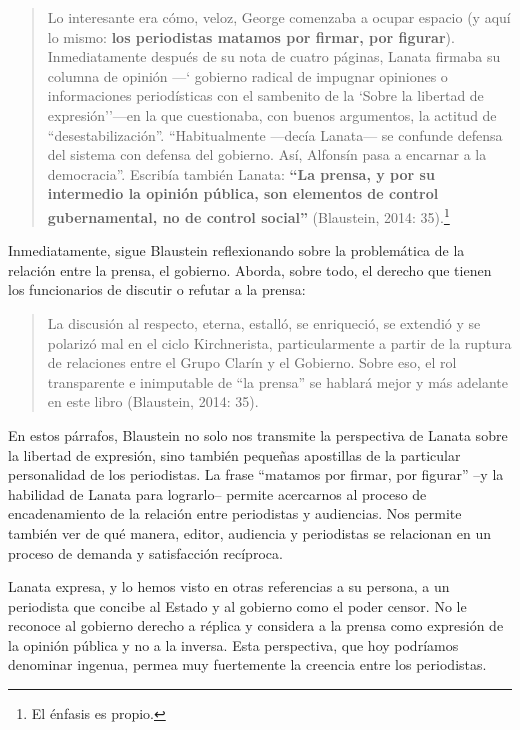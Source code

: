\begin{quote}
Lo interesante era cómo, veloz, George comenzaba a ocupar espacio (y aquí lo mismo: \textbf{los periodistas matamos por firmar, por figurar}). Inmediatamente después de su nota de cuatro páginas, Lanata firmaba su columna de opinión ---` gobierno radical de impugnar opiniones o informaciones periodísticas con el sambenito de la `Sobre la libertad de expresión''---en la que cuestionaba, con buenos argumentos, la actitud de \enquote{desestabilización}. \enquote{Habitualmente ---decía Lanata--- se confunde defensa del sistema con defensa del gobierno. Así, Alfonsín pasa a encarnar a la democracia}. Escribía también Lanata: \textbf{\enquote{La prensa, y por su intermedio la opinión pública, son elementos de control gubernamental, no de control social}} (Blaustein, 2014: 35).\footnote{El énfasis es propio.}
\end{quote}

Inmediatamente, sigue Blaustein reflexionando sobre la problemática de la relación entre la prensa, el gobierno. Aborda, sobre todo, el derecho que tienen los funcionarios de discutir o refutar a la prensa:

\begin{quote}
La discusión al respecto, eterna, estalló, se enriqueció, se extendió y se polarizó mal en el ciclo Kirchnerista, particularmente a partir de la ruptura de relaciones entre el Grupo Clarín y el Gobierno. Sobre eso, el rol transparente e inimputable de \enquote{la prensa} se hablará mejor y más adelante en este libro (Blaustein, 2014: 35).
\end{quote}

En estos párrafos, Blaustein no solo nos transmite la perspectiva de Lanata sobre la libertad de expresión, sino también pequeñas apostillas de la particular personalidad de los periodistas. La frase \enquote{matamos por firmar, por figurar} --y la habilidad de Lanata para lograrlo-- permite acercarnos al proceso de encadenamiento de la relación entre periodistas y audiencias. Nos permite también ver de qué manera, editor, audiencia y periodistas se relacionan en un proceso de demanda y satisfacción recíproca.

Lanata expresa, y lo hemos visto en otras referencias a su persona, a un periodista que concibe al Estado y al gobierno como el poder censor. No le reconoce al gobierno derecho a réplica y considera a la prensa como expresión de la opinión pública y no a la inversa. Esta perspectiva, que hoy podríamos denominar ingenua, permea muy fuertemente la creencia entre los periodistas.


